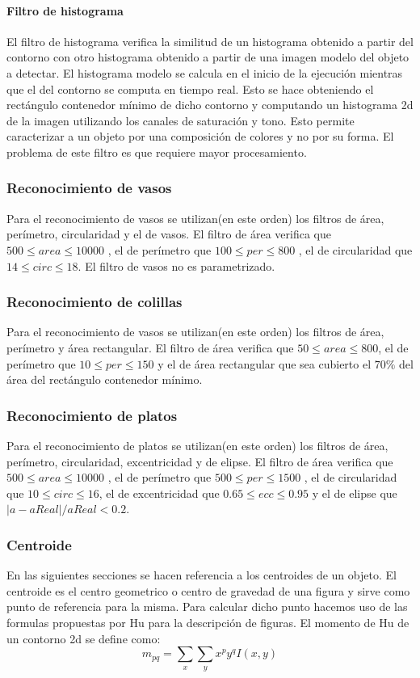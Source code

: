 	\paragraph{Filtro de histograma}
	El filtro de histograma verifica la similitud de un histograma obtenido a partir del contorno con otro histograma obtenido a partir de 
	una imagen modelo del objeto a detectar. El histograma modelo se calcula en el inicio de la ejecución mientras que el del contorno se
	computa en tiempo real. Esto se hace obteniendo el rectángulo contenedor mínimo de dicho contorno y computando un histograma 2d de la imagen
	utilizando los canales de saturación y tono. Esto permite caracterizar a un objeto por una composición de colores y no por su forma. El 
	problema de este filtro es que requiere mayor procesamiento.
	
	\subsubsection{Reconocimiento de vasos}
	Para el reconocimiento de vasos se utilizan(en este orden) los filtros de área, perímetro, circularidad y el de vasos.
	El filtro de área verifica que $500 \leq area \leq 10000 $ , el de perímetro que $100 \leq per \leq 800 $ , el de circularidad
	que $14 \leq circ \leq 18$. El filtro de vasos no es parametrizado. 
	
	\subsubsection{Reconocimiento de colillas}
	Para el reconocimiento de vasos se utilizan(en este orden) los filtros de área, perímetro y área rectangular.
	El filtro de área verifica que $50 \leq area \leq 800 $, el de perímetro que $10 \leq per \leq 150 $ y el de área rectangular
	que sea cubierto el $70\%$ del área del rectángulo contenedor mínimo.
	
	\subsubsection{Reconocimiento de platos}
	Para el reconocimiento de platos se utilizan(en este orden) los filtros de área, perímetro, circularidad, excentricidad y de elipse.
	El filtro de área verifica que $500 \leq area \leq 10000 $ , el de perímetro que $500 \leq per \leq 1500 $ , el de circularidad
	que $10 \leq circ \leq 16$, el de excentricidad que $0.65 \leq ecc \leq 0.95$ y el de elipse que $|a-aReal|/ aReal < 0.2$.
	
	\subsubsection{Centroide}
	En las siguientes secciones se hacen referencia a los centroides 
	de un objeto. El centroide es el centro geometrico o centro de 
	gravedad de una figura y 
	sirve como punto de referencia para la misma. Para calcular dicho 
	punto hacemos uso de las formulas propuestas por Hu \cite{Hu1962} para la 
	descripción de figuras. El momento de Hu de un contorno 2d se define como:
	\begin{equation}
		m_{pq}=\sum_{x}{\sum_{y}{x^py^qI(x,y)}}
	\end{equation}
	
